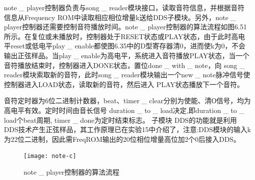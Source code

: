 \documentclass{../source/Experiment}
\begin{document}
                note \_ player控制器负责与song \_ reader模块接口，读取音符信息，并根据音符信息从Frequency ROM中读取相应相位增量k送给DDS子模块。另外，note \_ player控制器还需要控制音符播放时间。note \_ player控制器的算法流程如图6.51所示。在复位或未播放时，控制器处于RESET状态或PLAY状态，由于此时高电平reset或低电平play \_ enable都使图6.35中的D型寄存器清0，进而使k为0，不会输出正弦样品。当play \_ enable为高电平，系统进入音符播放PLAY状态，当一个音符播放结束时，控制器进入DONE状态，置位done \_ with \_ note，向 song \_ reader模块索取新的音符，此时song \_ reader模块输出一个new \_ note脉冲信号使控制器进入LOAD状态，读取新的音符，然后进入 PLAY状态播放下一个音符。

                音符定时器为6位二进制计数器，beat、timer \_ clear分别为使能、清О信号，均为高电平有效。定时时间由音长信号 duration \_ to \_ load决定,即duration \_ to \_ load个beat周期, timer \_ done为定时结束标志。
                子模块 DDS的功能就是利用DDS技术产生正弦样品，其工作原理已在实验15中介绍了，注意:DDS模块的输入k为22位二进制，因此需FreqROM输出的20位相位增量高位加2个0后接入DDS。

                \begin{figure}[H]
                    \centering
                    \texttt{[image: note-c]}
                    \caption{note \_ player控制器的算法流程}
                \end{figure}
                
\end{document}
